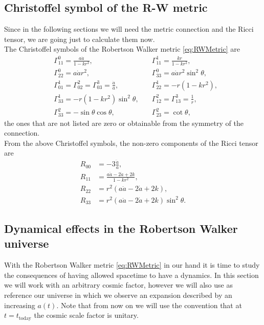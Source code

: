 \subsection{Christoffel symbol of the R-W metric}
Since in the following sections we will need the metric connection and the Ricci tensor, we are going just to calculate them now.\\
The Christoffel symbols of the Robertson Walker metric \eqref{eq:RWMetric} are
\begin{align}
    &\Gamma^0_{11}=\frac{a\dot{a}}{1-kr^2}, \quad&\Gamma^1_{11}=\frac{kr}{1-kr^2},\nonumber\\&\Gamma^0_{22}=a\dot{a}r^2, \quad&\Gamma^0_{33}=a\dot{a}r^2\sin^2\theta,\nonumber\\&\Gamma^1_{01}=\Gamma^2_{02}=\Gamma^3_{03}=\frac{\dot{a}}{a}, \quad &\Gamma^1_{22}=-r(1-kr^2),\nonumber\\&\Gamma^1_{33}=-r(1-kr^2)\sin^2\theta, \quad &\Gamma^2_{12}=\Gamma^3_{13}=\frac{1}{r},\nonumber\\&\Gamma^2_{33}=-\sin\theta\cos\theta, \quad &\Gamma^2_{23}=\cot\theta,\label{eq:RWChristoffel}
\end{align}
the ones that are not listed are zero or obtainable from the symmetry of the connection.\\
From the above Christoffel symbols, the non-zero components of the Ricci tensor are
\begin{align}
    R_{00}&=-3\frac{\ddot a}{a},\nonumber\\
    R_{11}&=\frac{a\ddot{a}-2\dot a+2k}{1-kr^2},\nonumber\\
    R_{22}&=r^2(a\ddot{a}-2\dot a+2k),\nonumber\\
    R_{33}&=r^2(a\ddot{a}-2\dot a+2k)\sin^2\theta.\label{eq:RWRicci}
\end{align}
\subsection{Dynamical effects in the Robertson Walker universe}
With the Robertson Walker metric \eqref{eq:RWMetric} in our hand it is time to study the consequences of having allowed spacetime to have a dynamics. In this section we will work with an arbitrary cosmic factor, however we will also use as reference our universe in which we observe an expansion described by an increasing $a(t)$. Note that from now on we will use the convention that at $t=t_\text{today}$ the cosmic scale factor is unitary.
